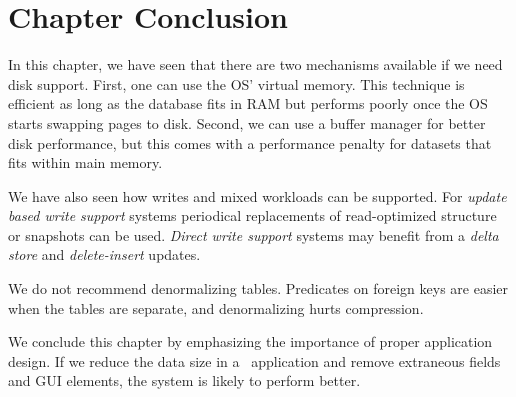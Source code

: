 \section{Chapter Conclusion}
\label{sec:Chapter Conclusion}
In this chapter, we have seen that there are two mechanisms available if we need disk support. First, one can use the OS' virtual memory. This technique is efficient as long as the database fits in RAM but performs poorly once the OS starts swapping pages to disk. Second, we can use a buffer manager for better disk performance, but this comes with a performance penalty for datasets that fits within main memory.

We have also seen how writes and mixed workloads can be supported. For \textit{update based write support} systems periodical replacements of read-optimized structure or snapshots can be used. \textit{Direct write support} systems may benefit from a \textit{delta store} and \textit{delete-insert} updates.

We do not recommend denormalizing tables. Predicates on foreign keys are easier when the tables are separate, and denormalizing hurts compression.

We conclude this chapter by emphasizing the importance of proper application design. If we reduce the data size in a \bd~application and remove extraneous fields and GUI elements, the system is likely to perform better.
